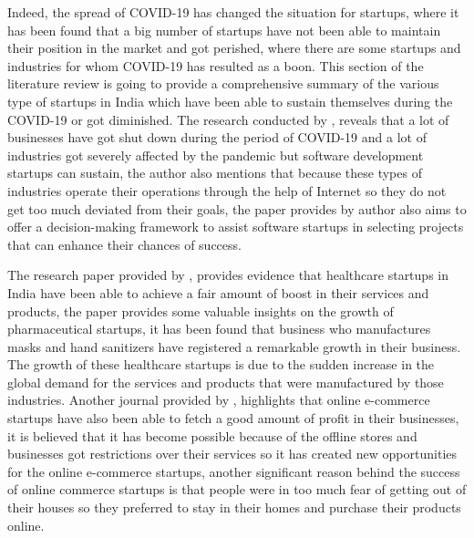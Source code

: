 \documentclass[12pt]{article}
\begin{document}
Indeed, the spread of COVID-19 has changed the situation for startups, where it has been found that a big number of startups have not been able to maintain their position in the market and got perished, where there are some startups and industries for whom COVID-19 has resulted as a boon. This section of the literature review is going to provide a comprehensive summary of the various type of startups in India which have been able to sustain themselves during the COVID-19 or got diminished. The research conducted by \citep{parthasarathy2022decision}, reveals that a lot of businesses have got shut down during the period of COVID-19 and a lot of industries got severely affected by the pandemic but software development startups can sustain, the author also mentions that because these types of industries operate their operations through the help of Internet so they do not get too much deviated from their goals, the paper provides by author also aims to offer a decision-making framework to assist software startups in selecting projects that can enhance their chances of success. 

The research paper provided by \citep{mittal2021impact}, provides evidence that healthcare startups in India have been able to achieve a fair amount of boost in their services and products, the paper provides some valuable insights on the growth of pharmaceutical startups, it has been found that business who manufactures masks and hand sanitizers have registered a remarkable growth in their business. The growth of these healthcare startups is due to the sudden increase in the global demand for the services and products that were manufactured by those industries. Another journal provided by \citep{agarwal2021changing}, highlights that online e-commerce startups have also been able to fetch a good amount of profit in their businesses, it is believed that it has become possible because of the offline stores and businesses got restrictions over their services so it has created new opportunities for the online e-commerce startups, another significant reason behind the success of online commerce startups is that people were in too much fear of getting out of their houses so they preferred to stay in their homes and purchase their products online.  
\end{document}
